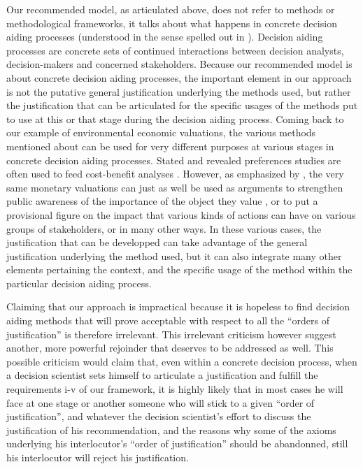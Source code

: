 \documentclass[preprint, french, english, 11pt]{elsarticle}%
\begin{document}
Our recommended model, as articulated above, does not refer to methods or methodological frameworks, it talks about what happens in concrete decision aiding processes (understood in the sense spelled out in \citep{tsoukias_concept_2007}). Decision aiding processes are concrete sets of continued interactions between decision analysts, decision-makers and concerned stakeholders. Because our recommended model is about concrete decision aiding processes, the important element in our approach is not the putative general justification underlying the methods used, but rather the justification that can be articulated for the specific usages of the methods put to use at this or that stage during the decision aiding process. Coming back to our example of environmental economic valuations, the various methods mentioned about can be used for very different purposes at various stages in concrete decision aiding processes. Stated and revealed preferences studies are often used to feed cost-benefit analyses \citep{layard_cost-benefit_1994}. However, as emphasized by \citep{meinard_ethical_2016}, the very same monetary valuations can just as well be used as arguments to strengthen public awareness of the importance of the object they value \citep{salles_valuing_2011}, or to put a provisional figure on the impact that various kinds of actions can have on various groups of stakeholders, or in many other ways. In these various cases, the justification that can be developped can take advantage of the general justification underlying the method used, but it can also integrate many other elements pertaining the context, and the specific usage of the method within the particular decision aiding process.

Claiming that our approach is impractical because it is hopeless to find decision aiding methods that will prove acceptable with respect to all the ``orders of justification'' is therefore irrelevant. This irrelevant criticism however suggest another, more powerful rejoinder that deserves to be addressed as well. This possible criticism would claim that, even within a concrete decision process, when a decision scientist sets himself to articulate a justification and fulfill the requirements i-v of our framework, it is highly likely that in most cases he will face at one stage or another someone who will stick to a given ``order of justification'', and whatever the decision scientist's effort to discuss the justification of his recommendation, and the reasons why some of the axioms underlying his interlocutor's ``order of justification'' should be abandonned, still his interlocutor will reject his justification.
\end{document}
